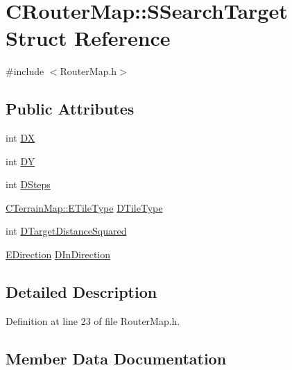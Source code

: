 \hypertarget{structCRouterMap_1_1SSearchTarget}{}\section{C\+Router\+Map\+:\+:S\+Search\+Target Struct Reference}
\label{structCRouterMap_1_1SSearchTarget}


{\ttfamily \#include $<$Router\+Map.\+h$>$}

\subsection*{Public Attributes}
\begin{DoxyCompactItemize}
\item 
int \hyperlink{structCRouterMap_1_1SSearchTarget_a1ba72713642034425d7db39ffb2135da}{DX}
\item 
int \hyperlink{structCRouterMap_1_1SSearchTarget_adab361d87964252b68e5b5b436d1855d}{DY}
\item 
int \hyperlink{structCRouterMap_1_1SSearchTarget_aa6f669010893468be9c8c3599d4d1909}{D\+Steps}
\item 
\hyperlink{classCTerrainMap_aff2ab991e237269941416dd79d8871d4}{C\+Terrain\+Map\+::\+E\+Tile\+Type} \hyperlink{structCRouterMap_1_1SSearchTarget_a20598a9fd12e7a87ecd920931797b269}{D\+Tile\+Type}
\item 
int \hyperlink{structCRouterMap_1_1SSearchTarget_a0a3164fdaa28c8b76422ce844dc843a0}{D\+Target\+Distance\+Squared}
\item 
\hyperlink{GameDataTypes_8h_acb2b033915f6659a71a38b5aa6e4eb42}{E\+Direction} \hyperlink{structCRouterMap_1_1SSearchTarget_a82e6cd6f82777f8c5574015f7574bb84}{D\+In\+Direction}
\end{DoxyCompactItemize}


\subsection{Detailed Description}


Definition at line 23 of file Router\+Map.\+h.



\subsection{Member Data Documentation}
\hypertarget{structCRouterMap_1_1SSearchTarget_a82e6cd6f82777f8c5574015f7574bb84}{}\label{structCRouterMap_1_1SSearchTarget_a82e6cd6f82777f8c5574015f7574bb84} 
